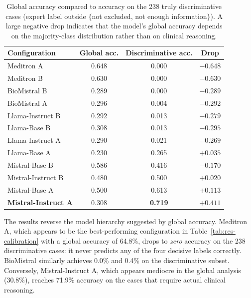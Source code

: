 \begin{table}[htbp]
    \centering
    \caption{Global accuracy compared to accuracy on the 238 truly 
        discriminative cases (expert label outside 
        $\{$not excluded, not enough information$\}$). A large negative 
        drop indicates that the model's global accuracy depends on the 
        majority-class distribution rather than on clinical reasoning.}
    \label{tab:res-non-trivial}
    \small
    \begin{tabular}{@{}lccc@{}}
        \toprule
        \textbf{Configuration} & 
        \textbf{Global acc.} & 
        \textbf{Discriminative acc.} & 
        \textbf{Drop} \\
        \midrule
        Meditron A         & 0.648 & 0.000 & $-0.648$ \\
        Meditron B         & 0.630 & 0.000 & $-0.630$ \\
        BioMistral B       & 0.289 & 0.000 & $-0.289$ \\
        BioMistral A       & 0.296 & 0.004 & $-0.292$ \\
        Llama-Instruct B   & 0.292 & 0.013 & $-0.279$ \\
        Llama-Base B       & 0.308 & 0.013 & $-0.295$ \\
        Llama-Instruct A   & 0.290 & 0.021 & $-0.269$ \\
        Llama-Base A       & 0.230 & 0.265 & $+0.035$ \\
        Mistral-Base B     & 0.586 & 0.416 & $-0.170$ \\
        Mistral-Instruct B & 0.480 & 0.500 & $+0.020$ \\
        Mistral-Base A     & 0.500 & 0.613 & $+0.113$ \\
        \midrule
        \textbf{Mistral-Instruct A} & 0.308 & \textbf{0.719} & \textbf{$+0.411$} \\
        \bottomrule
    \end{tabular}
\end{table}

The results reverse the model hierarchy suggested by global accuracy. 
Meditron A, which appears to be the best-performing configuration in 
Table~\ref{tab:res-calibration} with a global accuracy of 64.8\%, drops 
to \textit{zero} accuracy on the 238 discriminative cases: it never 
predicts any of the four decisive labels correctly. BioMistral similarly 
achieves 0.0\% and 0.4\% on the discriminative subset. Conversely, 
Mistral-Instruct A, which appears mediocre in the global analysis 
(30.8\%), reaches 71.9\% accuracy on the cases that require actual 
clinical reasoning.

